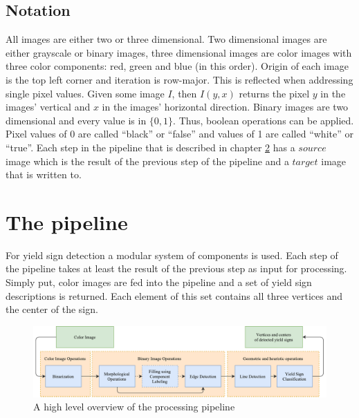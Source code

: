 \documentclass{report}
\begin{document}
\section{Notation}

All images are either two or three dimensional. Two dimensional images
are either grayscale or binary images, three dimensional images are
color images with three color components: red, green and blue (in this
order). Origin of each image is the top left corner and iteration is
row-major. This is reflected when addressing single pixel
values. Given some image \( I \), then \( I(y, x) \) returns the pixel
\( y \) in the images' vertical and \( x \) in the images' horizontal
direction. Binary images are two dimensional and every value is in
\(\{ 0, 1 \}\). Thus, boolean operations can be applied. Pixel values
of 0 are called ``black'' or ``false'' and values of 1 are called
``white'' or ``true''. Each step in the pipeline that is described in
chapter \ref{chap:pipeline} has a \( source \) image which is the
result of the previous step of the pipeline and a \( target \) image
that is written to.

{\color{red}{To do: Nice picture of the final result}}


\pagebreak
\chapter{The pipeline}
\label{chap:pipeline}

For yield sign detection a modular system of components is used. Each
step of the pipeline takes at least the result of the previous step as
input for processing. Simply put, color images are fed into the
pipeline and a set of yield sign descriptions is returned. Each
element of this set contains all three vertices and the center of the
sign.

\begin{figure}
  \centering
    \includegraphics[width=1\textwidth]{src/pipeline}
  \caption{A high level overview of the processing pipeline}
  \label{img:pipeline}
\end{figure}
\end{document}
